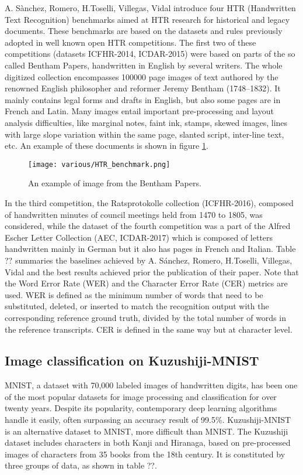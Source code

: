 A. Sànchez, Romero, H.Toselli, Villegas, Vidal  introduce four HTR (Handwritten Text Recognition) benchmarks aimed at HTR research for historical and legacy documents. These benchmarks are based on the datasets and rules previously adopted in well known open HTR competitions. The first two of these competitions (datasets ICFHR-2014, ICDAR-2015) were based on parts of the so called Bentham Papers, handwritten in English by several writers. The whole digitized collection encompasses 100000 page images of text authored by the renowned English philosopher and reformer Jeremy Bentham (1748–1832). It mainly contains legal forms and drafts in English, but also some pages are in French and Latin. Many images entail important pre-processing and layout analysis difficulties, like marginal notes, faint ink, stamps, skewed images, lines with large slope variation within the same page, slanted script, inter-line text, etc. An example of these documents is shown in figure \ref{fig:HTR_benchmark}.


\begin{figure}[h]
	\caption{An example of image from the Bentham Papers.}
	\centering
	\texttt{[image: various/HTR\_benchmark.png]}
	\label{fig:HTR_benchmark}
\end{figure}

In the third competition, the Ratsprotokolle collection (ICFHR-2016), composed of handwritten minutes of council meetings held from 1470 to 1805, was considered, while the dataset of the fourth competition was a part of the Alfred Escher Letter Collection (AEC, ICDAR-2017) which is composed of letters handwritten mainly in German but it also has pages in French and Italian. Table ?? summaries the baselines achieved by A. Sánchez, Romero, H.Toselli, Villegas, Vidal and the best results achieved prior the publication of their paper. Note that the Word Error Rate (WER) and the Character Error Rate (CER) metrics are used. WER is defined as the minimum number of words that need to be substituted, deleted, or inserted to match the recognition output with the corresponding reference ground truth, divided by the total number of words in the reference transcripts. CER is defined in the same way but at character level.

\subsection{Image classification on Kuzushiji-MNIST}
\label{ssec:imagemnist}

MNIST, a dataset with 70,000 labeled images of handwritten digits, has been one of the most popular datasets for image processing and classification for over twenty years. Despite its popularity, contemporary deep learning algorithms handle it easily, often surpassing an accuracy result of 99.5\%. Kuzushiji-MNIST is an alternative dataset to MNIST, more difficult than MNIST. The Kuzushiji dataset includes characters in both Kanji and Hiranaga, based on pre-processed images of characters from 35 books from the 18th century. It is constituted by three groups of data, as shown in table ??.

